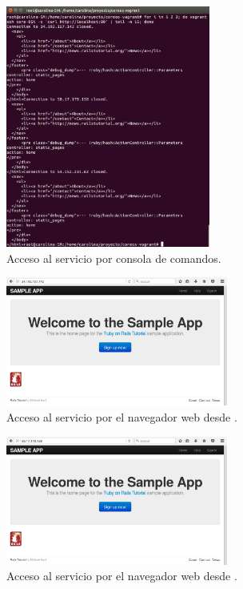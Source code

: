 \begin{figure}[H]
\centering
\includegraphics[width=0.6\textwidth]{images/figures/curl-aws-3.png}
\caption{Acceso al servicio por consola de comandos.}
\end{figure}

\begin{figure}[H]
\centering
\includegraphics[width=0.65\textwidth]{images/figures/nav-1.png}
\caption{Acceso al servicio por el navegador web desde .}
\end{figure}

\begin{figure}[H]
\centering
\includegraphics[width=0.65\textwidth]{images/figures/nav-2.png}
\caption{Acceso al servicio por el navegador web desde .}
\end{figure}

